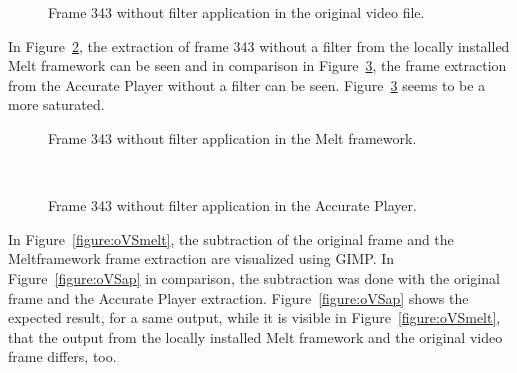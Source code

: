\documentclass[../MasterThesis.tex]{subfiles}
\begin{document}
\begin{figure}[H]
	\begin{center}
		\caption[Frame 343 without filter application in the original video file.]{Frame 343 without filter application in the original video file.}
		\label{figure:nofilterO}
	\end{center}
\end{figure}


In Figure~\ref{figure:nofilterMelt}, the extraction of frame 343 without a filter from the locally installed Melt framework can be seen and in comparison in Figure~\ref{figure:nofilterAP}, the frame extraction from the Accurate Player without a filter can be seen. Figure~\ref{figure:nofilterAP} seems to be a more saturated.


\begin{minipage}{0.48\textwidth}
	\begin{figure}[H]
		\begin{center}
			\caption[Frame 343 without filter application in the Melt framework.]{Frame 343 without filter application in the Melt framework.}
			\label{figure:nofilterMelt}
		\end{center}
	\end{figure}
\end{minipage}\begin{minipage}{0.04\textwidth}
	\ 
\end{minipage}\begin{minipage}{0.48\textwidth}
	\begin{figure}[H]
		\begin{center}
			\caption[Frame 343 without filter application in the Accurate Player.]{Frame 343 without filter application in the Accurate Player.}
			\label{figure:nofilterAP}
		\end{center}
	\end{figure}
\end{minipage}

\vspace*{2em}
In Figure~\ref{figure:oVSmelt}, the subtraction of the original frame and the Meltframework frame extraction are visualized using GIMP. In Figure~\ref{figure:oVSap} in comparison, the subtraction was done with the original frame and the Accurate Player extraction. Figure~\ref{figure:oVSap} shows the expected result, for a same output, while it is visible in Figure~\ref{figure:oVSmelt}, that the output from the locally installed Melt framework and the original video frame differs, too.
\end{document}
